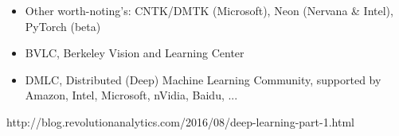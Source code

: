 \begin{frame}
{\scriptsize
\begin{itemize}\setlength\itemsep{0.5em}
\item[\raisebox{-0.4ex}{\alert{\HandRight}}] Other worth-noting's: CNTK/DMTK (Microsoft), Neon (Nervana \& Intel), PyTorch (\alert{beta})
\item BVLC, Berkeley Vision and Learning Center 
\item DMLC, Distributed (Deep) Machine Learning Community, supported by Amazon, Intel, Microsoft, nVidia, Baidu, ...
\end{itemize}
}

\begin{center}
{\color{red}\scriptsize
http://blog.revolutionanalytics.com/2016/08/deep-learning-part-1.html
}
\end{center}

\end{frame}


